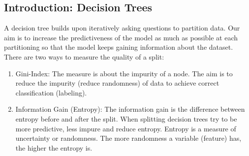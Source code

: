 \documentclass{article}
\begin{document}
\subsection{Introduction: Decision Trees}
A decision tree builds upon iteratively asking questions to partition data.
Our aim is to increase the predictiveness of the model as much as possible at each partitioning so that the model keeps gaining information about the dataset.
There are two ways to measure the quality of a split:
\begin{enumerate}
	\item Gini-Index: The measure is about the impurity of a node. The aim is to reduce the impurity (reduce randomness) of data to achieve correct classification (labeling).
	\item Information Gain (Entropy):
	The information gain is the difference between entropy before and after the split.
	When splitting decision trees try to be more predictive, less impure and reduce entropy. Entropy is a measure of uncertainty or randomness. The more randomness a variable (feature) has, the higher the entropy is.  
\end{enumerate}
\end{document}

